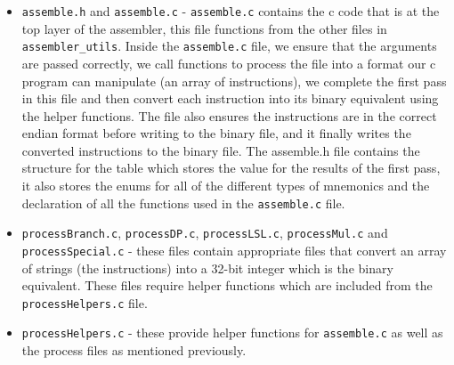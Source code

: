 \documentclass[11pt]{article}
\begin{document}
\begin{itemize}
	\item {\tt{assemble.h}} and {\tt{assemble.c}} - {\tt{assemble.c}} contains the c code that is at the top layer of the assembler, this file functions from the other files in {\tt{assembler\_utils}}. Inside the {\tt{assemble.c}} file, we ensure that the arguments are passed correctly, we call functions to process the file into a format our c program can manipulate (an array of instructions), we complete the first pass in this file and then convert each instruction into its binary equivalent using the helper functions. The file also ensures the instructions are in the correct endian format before writing to the binary file, and it finally writes the converted instructions to the binary file.
    The assemble.h file contains the structure for the table which stores the value for the results of the first pass, it also stores the enums for all of the different types of mnemonics and the declaration of all the functions used in the {\tt{assemble.c}} file.
	\item {\tt{processBranch.c}}, {\tt{processDP.c}}, {\tt{processLSL.c}}, {\tt{processMul.c}} and {\tt{processSpecial.c}} - these files contain appropriate files that convert an array of strings (the instructions) into a 32-bit integer which is the binary equivalent. These files require helper functions which are included from the {\tt{processHelpers.c}} file.
	\item {\tt{processHelpers.c}} - these provide helper functions for {\tt{assemble.c}} as well as the process files as mentioned previously.
	
\end{itemize}


\begin{center}

\end{center}
\end{document}
